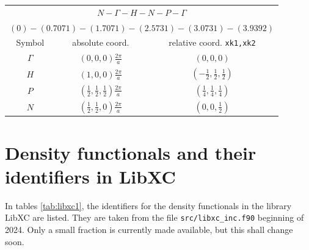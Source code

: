 \documentclass[final,12pt,makeidx,DIV=calc]{article}
\begin{document}
{{{\begin{center}
\renewcommand\arraystretch{1.5}
\begin{tabular}{|c|c|c|}
\hline
\multicolumn{3}{|c|}{$N-\Gamma-H-N-P-\Gamma$}\\
\multicolumn{3}{|c|}{$(0)-(0.7071)-(1.7071)-(2.5731)-(3.0731)-(3.9392)$}\\
\hline
Symbol & absolute coord. & relative coord. \texttt{xk1,xk2}\\
\hline
$\Gamma$   & $(0,0,0) \frac{2\pi}{a}$ & $(0,0,0)$ \\ 
$H$        & $(1,0,0) \frac{2\pi}{a}$ & $(-\frac{1}{2},\frac{1}{2},\frac{1}{2})$ \\ 
$P$        & $(\frac{1}{2},\frac{1}{2},\frac{1}{2}) \frac{2\pi}{a}$ & $(\frac{1}{4},\frac{1}{4},\frac{1}{4})$ \\ 
$N$        & $(\frac{1}{2},\frac{1}{2},0) \frac{2\pi}{a}$ & $(0,0,\frac{1}{2})$ \\ 
\hline
\end{tabular}
\renewcommand\arraystretch{1.}
\end{center}
\clearpage


\newpage
\section{Density functionals and their identifiers in LibXC}
\label{sec:libxcids}
In tables \ref{tab:libxc1}, the identifiers for the density
functionals in the library LibXC are listed. They are taken from the
file \verb|src/libxc_inc.f90| beginning of 2024. Only a small fraction
is currently made available, but this shall change soon.


}}}
\end{document}
